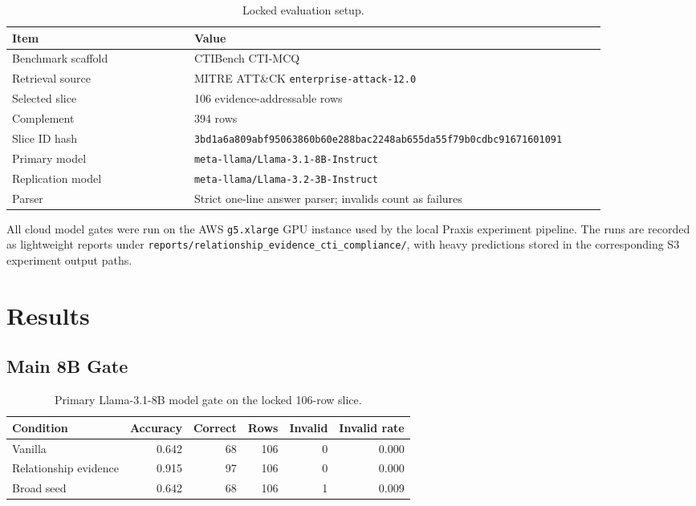 \documentclass[10pt]{article}
\begin{document}
\begin{table}[t]
  \centering
  \caption{Locked evaluation setup.}
  \label{tab:setup}
  \begin{tabular}{p{0.28\linewidth}p{0.58\linewidth}}
    \toprule
    Item & Value \\
    \midrule
    Benchmark scaffold & CTIBench CTI-MCQ \\
    Retrieval source & MITRE ATT\&CK \texttt{enterprise-attack-12.0} \\
    Selected slice & 106 evidence-addressable rows \\
    Complement & 394 rows \\
    Slice ID hash & \texttt{3bd1a6a809abf95063860b60e288bac2248ab655da55f79b0cdbc91671601091} \\
    Primary model & \texttt{meta-llama/Llama-3.1-8B-Instruct} \\
    Replication model & \texttt{meta-llama/Llama-3.2-3B-Instruct} \\
    Parser & Strict one-line answer parser; invalids count as failures \\
    \bottomrule
  \end{tabular}
\end{table}

All cloud model gates were run on the AWS \texttt{g5.xlarge} GPU instance used by the local Praxis experiment pipeline.
The runs are recorded as lightweight reports under \texttt{reports/relationship\_evidence\_cti\_compliance/}, with heavy predictions stored in the corresponding S3 experiment output paths.

\section{Results}

\subsection{Main 8B Gate}

\begin{table}[t]
  \centering
  \caption{Primary Llama-3.1-8B model gate on the locked 106-row slice.}
  \label{tab:main8b}
  \begin{tabular}{lrrrrr}
    \toprule
    Condition & Accuracy & Correct & Rows & Invalid & Invalid rate \\
    \midrule
    Vanilla & 0.642 & 68 & 106 & 0 & 0.000 \\
    Relationship evidence & 0.915 & 97 & 106 & 0 & 0.000 \\
    Broad seed & 0.642 & 68 & 106 & 1 & 0.009 \\
    \bottomrule
  \end{tabular}
\end{table}
\end{document}

